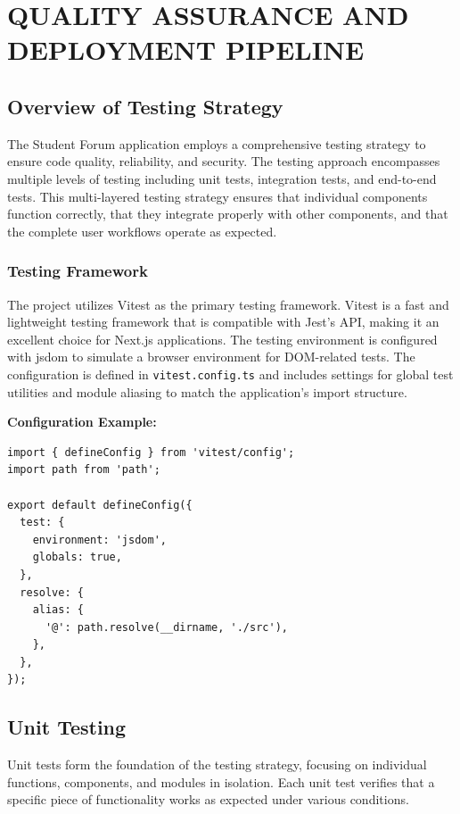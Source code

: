 \chapter*{QUALITY ASSURANCE AND DEPLOYMENT PIPELINE}

\section{Overview of Testing Strategy}

The Student Forum application employs a comprehensive testing strategy to ensure code quality, reliability, and security. The testing approach encompasses multiple levels of testing including unit tests, integration tests, and end-to-end tests. This multi-layered testing strategy ensures that individual components function correctly, that they integrate properly with other components, and that the complete user workflows operate as expected.

\subsection{Testing Framework}

The project utilizes Vitest as the primary testing framework. Vitest is a fast and lightweight testing framework that is compatible with Jest's API, making it an excellent choice for Next.js applications. The testing environment is configured with jsdom to simulate a browser environment for DOM-related tests. The configuration is defined in \texttt{vitest.config.ts} and includes settings for global test utilities and module aliasing to match the application's import structure.

\textbf{Configuration Example:}
\begin{verbatim}
import { defineConfig } from 'vitest/config';
import path from 'path';

export default defineConfig({
  test: {
    environment: 'jsdom',
    globals: true,
  },
  resolve: {
    alias: {
      '@': path.resolve(__dirname, './src'),
    },
  },
});
\end{verbatim}

\section{Unit Testing}

Unit tests form the foundation of the testing strategy, focusing on individual functions, components, and modules in isolation. Each unit test verifies that a specific piece of functionality works as expected under various conditions.

